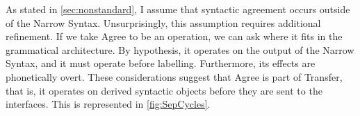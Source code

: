 \documentclass[MilwayThesis]{subfiles}
\begin{document}
As stated in \cref{sec:nonstandard}, I assume that syntactic agreement occurs outside of the Narrow Syntax.
Unsurprisingly, this assumption requires additional refinement.
If we take Agree to be an operation, we can ask where it fits in the grammatical architecture.
By hypothesis, it operates on the output of the Narrow Syntax, and it must operate before labelling.
Furthermore, its effects are phonetically overt.
These considerations suggest that Agree is part of Transfer, that is, it operates on derived syntactic objects before they are sent to the interfaces.
This is represented in \cref{fig:SepCycles}.
%
%
%
%
\end{document}
